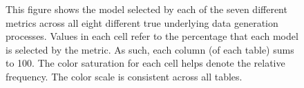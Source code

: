 \documentclass{article}\usepackage[]{graphicx}\usepackage[]{color}
\begin{document}
\begin{figure}
\caption{This figure shows the model selected by each of the seven different metrics across all eight different true underlying data generation processes. Values in each cell refer to the percentage that each model is selected by the metric. As such, each column (of each table) sums to 100. The color saturation for each cell helps denote the relative frequency. The color scale is consistent across all tables.}
\label{fig:modelIdentificationAll8}
\end{figure}
\end{document}
